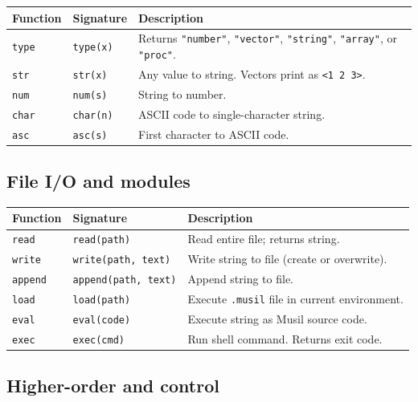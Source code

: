 \documentclass[11pt,a4paper]{article}
\begin{document}
\begin{longtable}{@{}L{3.2cm}L{3.8cm}L{7.5cm}@{}}
\toprule
\textbf{Function} & \textbf{Signature} & \textbf{Description} \\
\midrule
\endhead
\texttt{type}  & \texttt{type(x)}    & Returns \texttt{"number"}, \texttt{"vector"}, \texttt{"string"}, \texttt{"array"}, or \texttt{"proc"}. \\
\texttt{str}   & \texttt{str(x)}    & Any value to string. Vectors print as \texttt{<1 2 3>}. \\
\texttt{num}   & \texttt{num(s)}    & String to number. \\
\texttt{char}  & \texttt{char(n)}   & ASCII code to single-character string. \\
\texttt{asc}   & \texttt{asc(s)}    & First character to ASCII code. \\
\bottomrule
\end{longtable}

\subsection{File I/O and modules}

\begin{longtable}{@{}L{3.2cm}L{4.5cm}L{6.8cm}@{}}
\toprule
\textbf{Function} & \textbf{Signature} & \textbf{Description} \\
\midrule
\endhead
\texttt{read}    & \texttt{read(path)}              & Read entire file; returns string. \\
\texttt{write}   & \texttt{write(path, text)}       & Write string to file (create or overwrite). \\
\texttt{append}  & \texttt{append(path, text)}      & Append string to file. \\
\texttt{load}    & \texttt{load(path)}              & Execute \texttt{.musil} file in current environment. \\
\texttt{eval}    & \texttt{eval(code)}              & Execute string as Musil source code. \\
\texttt{exec}    & \texttt{exec(cmd)}               & Run shell command. Returns exit code. \\
\bottomrule
\end{longtable}

\subsection{Higher-order and control}
\end{document}
